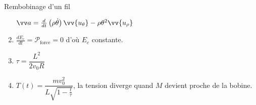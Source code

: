 \documentclass[french, a4paper, 11pt]{article}
\newcommand{\po}{\left(}         %
\newcommand{\pf}{\right)}        %
\newcommand{\pof}[1]{\po #1 \pf} %
\newcommand{\vect}[1]{\vv{#1}}
\newcommand{\uth}{\vect{u_\theta}}    %
\newcommand{\urho}{\vv{u_\rho}}       %
\begin{document}
\begin{cadre}{Rembobinage d'un fil}
\begin{multicols}{2}
\begin{enumerate}[label=\upshape\alph*)]
        $\vv a = \frac{d}{dt}\pof{\rho\dot\theta}\uth - \rho\theta^2\urho$
      \item $\frac{dE_{c}}{dt}=\mathcal P_{\text{force}} = 0$ d'où $E_{c}$ constante.
      \item $\tau = \dfrac{L^2}{2v_{0}R}$
      \item $T(t) = \dfrac{mv_{0}^{2}}{L\sqrt{1-\frac{t}{\tau}}}$, la tension diverge quand $M$ devient proche de la bobine.
    \end{enumerate}
  \end{multicols}
\end{cadre}
\end{document}
